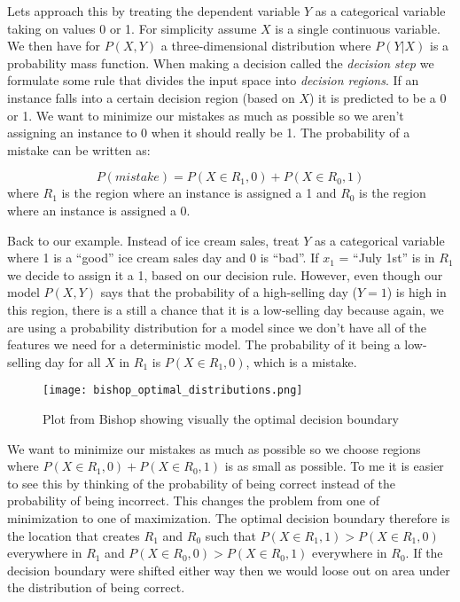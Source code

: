 Lets approach this by treating the dependent variable $Y$ as a categorical variable taking on values 0 or 1. For simplicity assume $X$ is a single continuous variable. We then have for $P(X,Y)$ a three-dimensional distribution where $P(Y|X)$ is a probability mass function. When making a decision called the \emph{decision step} we formulate some rule that divides the input space into \emph{decision regions}. If an instance falls into a certain decision region (based on $X$) it is predicted to be a 0 or 1. We want to minimize our mistakes as much as possible so we aren't assigning an instance to 0 when it should really be 1. The probability of a mistake can be written as:

\begin{equation}
P(mistake) = P(X\in R_1, 0) + P(X\in R_0, 1)
\end{equation}
where $R_1$ is the region where an instance is assigned a 1 and $R_0$ is the region where an instance is assigned a 0.

Back to our example. Instead of ice cream sales, treat $Y$ as a categorical variable where 1 is a ``good'' ice cream sales day and 0 is ``bad''.  If $x_1$ = ``July 1st'' is in $R_1$ we decide to assign it a 1, based on our decision rule. However, even though our model $P(X,Y)$ says that the probability of a high-selling day ($Y=1$) is high in this region, there is a still a chance that it is a low-selling day because again, we are using a probability distribution for a model since we don't have all of the features we need for a deterministic model. The probability of it being a low-selling day for all $X$ in $R_1$ is $P(X\in R_1, 0)$, which is a mistake.

 \begin{figure}[t] \label{fig:bishop_optimal_distributions}
\caption{Plot from Bishop showing visually the optimal decision boundary}
\centering
 \texttt{[image: bishop\_optimal\_distributions.png]}
 \end{figure}
 
We want to minimize our mistakes as much as possible so we choose regions where $P(X\in R_1, 0) + P(X\in R_0, 1)$ is as small as possible. To me it is easier to see this by thinking of the probability of being correct instead of the probability of being incorrect. This changes the problem from one of minimization to one of maximization. The optimal decision boundary therefore is the location that creates $R_1$ and $R_0$ such that $P(X\in R_1, 1) >  P(X\in R_1, 0)$ everywhere in $R_1$ and $P(X\in R_0, 0) >  P(X\in R_0, 1)$ everywhere in $R_0$. If the decision boundary were shifted either way then we would loose out on area under the distribution of being correct. 

